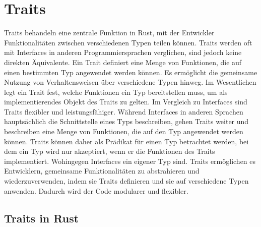 \documentclass[a4paper, 1ppt]{article}
\begin{document}
\section{Traits}
Traits behandeln eine zentrale Funktion in Rust, mit der Entwickler Funktionalitäten zwischen verschiedenen Typen teilen können. Traits werden oft mit Interfaces in anderen Programmiersprachen verglichen, sind jedoch keine direkten Äquivalente.
Ein Trait definiert eine Menge von Funktionen, die auf einen bestimmten Typ angewendet werden können. Es ermöglicht die gemeinsame Nutzung von Verhaltensweisen über verschiedene Typen hinweg. Im Wesentlichen legt ein Trait fest, welche Funktionen ein Typ bereitstellen muss, um als implementierendes Objekt des Traits zu gelten.
Im Vergleich zu Interfaces sind Traits flexibler und leistungsfähiger. Während Interfaces in anderen Sprachen hauptsächlich die Schnittstelle eines Typs beschreiben, gehen Traits weiter und beschreiben eine Menge von Funktionen, die auf den Typ angewendet werden können. Traits können daher als Prädikat für einen Typ betrachtet werden, bei dem ein Typ wird nur akzeptiert, wenn er die Funktionen des Traits implementiert. Wohingegen Interfaces ein eigener Typ sind.
Traits ermöglichen es Entwicklern, gemeinsame Funktionalitäten zu abstrahieren und wiederzuverwenden, indem sie Traits definieren und sie auf verschiedene Typen anwenden. Dadurch wird der Code modularer und flexibler.
\subsection{Traits in Rust}
\end{document}
